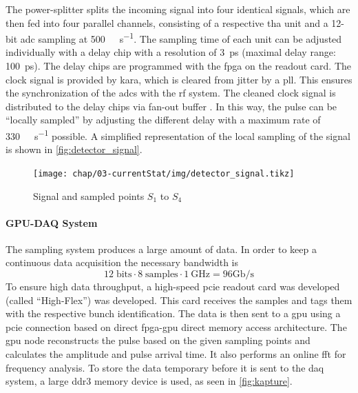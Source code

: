 The power-splitter splits the incoming signal into four identical signals, which are then fed into four parallel channels, consisting of a respective \gls{tha} unit and a 12-bit \gls{adc} sampling at \SI{500}{\mega\sample\per\second}. 
The sampling time of each unit can be adjusted individually with a delay chip with a resolution of \SI{3}{\pico \second} (maximal delay range: \SI{100}{\pico \second}). 
The delay chips are programmed with the \gls{fpga} on the readout card.
The clock signal is provided by \gls{kara}, which is cleared from jitter by a \gls{pll}. 
This ensures the synchronization of the \glspl{adc} with the \gls{rf} system. 
The cleaned clock signal is distributed to the delay chips via fan-out buffer \cite{caselleKAP}.
In this way, the pulse can be ``locally sampled'' by adjusting the different delay with a maximum rate of \SI{330}{\giga\sample\per\second} possible. 
A simplified representation of the local sampling of the signal is shown in \autoref{fig:detector_signal}.
\begin{figure}[tbh]
	\centering
	\texttt{[image: chap/03-currentStat/img/detector\_signal.tikz]}
	\caption{Signal and sampled points $S_1$ to $S_4$}
	\label{fig:detector_signal}
\end{figure}

\paragraph{GPU-DAQ System}
The sampling system produces a large amount of data.
In order to keep a continuous data  acquisition the necessary bandwidth is 
\begin{equation}
	12\;\text{bits} \cdot 8 \; \text{samples} \cdot \SI{1}{\GHz} = 96 \text{Gb/s}
\end{equation}
To ensure high data throughput, a high-speed \gls{pcie} readout card was developed (called ``High-Flex'') was developed.
This card receives the samples and tags them with the respective bunch identification. 
The data is then sent to a \gls{gpu} using a \gls{pcie} connection based on direct \gls{fpga}-\gls{gpu} direct memory access architecture.
The \gls{gpu} node reconstructs the pulse based on the given sampling points and calculates the amplitude and pulse arrival time. 
It also performs an online \gls{fft} for frequency analysis.
To store the data temporary before it is sent to the \gls{daq} system, a large \gls{ddr3} memory device is used, as seen in \autoref{fig:kapture}. \cite{caselleKAP}

